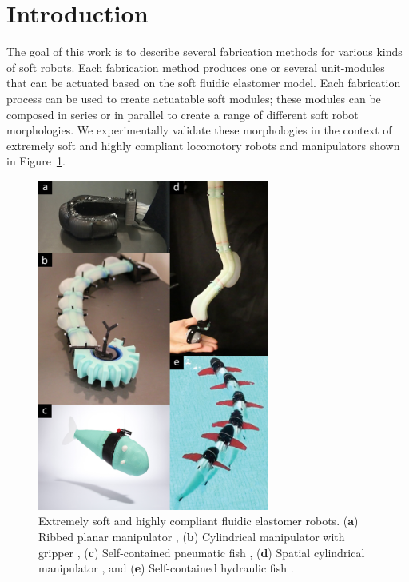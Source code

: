 
\section{Introduction}
\label{sec:Introduction}
The goal of this work is to describe several fabrication methods for various kinds of soft robots. 
Each fabrication method produces one or several unit-modules that can be actuated based on the soft fluidic elastomer model. 
Each fabrication process can be used to create actuatable soft modules; these modules can be composed in series or in parallel to create a range of different soft robot morphologies.
%
We experimentally validate these morphologies in the context of extremely soft and highly compliant locomotory robots and manipulators shown in Figure~\ref{fig:intro_new}.

\begin{figure}[!t]
  \centering
  \includegraphics[width=3in]{figures/introduction/intronew_v2.jpg}
  \caption{Extremely soft and highly compliant fluidic elastomer robots. (\textbf{a}) Ribbed planar manipulator \citep{marchese2014design}, (\textbf{b}) Cylindrical manipulator with gripper \citep{katzschmann2015autonomous}, (\textbf{c}) Self-contained pneumatic fish \citep{marchese2014autonomous}, (\textbf{d}) Spatial cylindrical manipulator \citep{marchese2015design}, and (\textbf{e}) Self-contained hydraulic fish \citep{katzschmann2014hydraulic}. }\label{fig:intro_new}
\end{figure}

